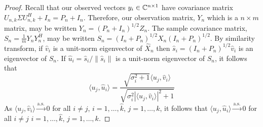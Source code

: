 \begin{proof}
Recall that our observed vectors $y_i\in\mathbb{C}^{n\times 1}$ have covariance matrix $U_{n,k}\Sigma U_{n,k}^H+I_n=P_n+I_n$. Therefore, our observation matrix, $Y_n$ which is a $n\times m$ matrix, may be written $Y_n=\left(P_n+I_n\right)^{1/2}Z_n$. The sample covariance matrix, $S_n=\frac{1}{m}Y_nY_n^H$, may be written $S_n=\left(I_n+P_n\right)^{1/2}X_n\left(I_n+P_n\right)^{1/2}$. By similarity transform, if $\widehat{v}_i$ is a unit-norm eigenvector of $\widehat{X}_n$ then $\widehat{s}_i=\left(I_n+P_n\right)^{1/2}\widehat{v}_i$ is an eigenvector of $S_n$. If $\widehat{u}_i=\widehat{s}_i/\|\widehat{s}_i\|$ is a unit-norm eigenvector of $S_n$, it follows that
\begin{equation*}
\langle u_j,\widehat{u}_i\rangle=\frac{\sqrt{\sigma_i^2+1}\langle u_j,\widehat{v}_i\rangle}{\sqrt{\sigma_i^2|\langle u_j,\widehat{v}_i\rangle|^2+1}}
\end{equation*}
As $\langle u_j,\widehat{v}_i\rangle\overset{\text{a.s.}}{\longrightarrow}0$ for all $i\neq j$, $i=1,\dots,\widehat{k}$, $j=1,\dots,k$, it follows that $\langle u_j,\widehat{u}_i\rangle\overset{\text{a.s.}}{\longrightarrow}0$ for all $i\neq j$ $i=1,\dots,\widehat{k}$, $j=1,\dots,k$.



\end{proof}
